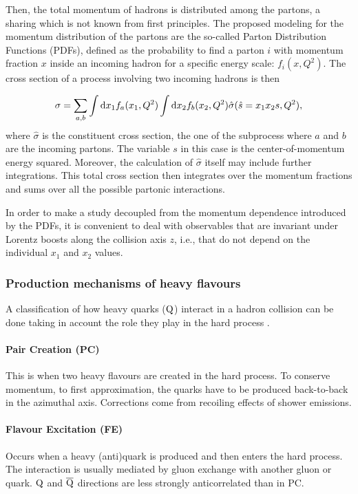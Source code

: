 \documentclass[a4paper,12pt]{article}
\begin{document}
Then, the total momentum of hadrons is distributed among the partons, a sharing which is not known from first principles. The proposed modeling for the momentum distribution of the partons are the so-called Parton Distribution Functions (PDFs), defined as the probability to find a parton $i$ with momentum fraction $x$ inside an incoming hadron for a specific energy scale: $f_i(x,Q^2)$. The cross section of a process involving two incoming hadrons is then

\begin{equation}
\sigma = \sum_{a,b} \int {\mathrm d} x_1 f_a(x_1,Q^2) \int {\mathrm d} x_2 f_b(x_2,Q^2) \hat{\sigma} (\hat{s}=x_1x_2s,Q^2), 
\end{equation}
where $\hat{\sigma}$ is the constituent cross section, the one of the subprocess where $a$ and $b$ are the incoming partons. The variable $s$ in this case is the center-of-momentum energy squared. Moreover, the calculation of $\hat{\sigma}$ itself may include further integrations. This total cross section then integrates over the momentum fractions and sums over all the possible partonic interactions.

In order to make a study decoupled from the momentum dependence introduced by the PDFs, it is convenient to deal with observables that are invariant under Lorentz boosts along the collision axis $z$, i.e., that do not depend on the individual $x_1$ and $x_2$ values.

\subsubsection{Production mechanisms of heavy flavours}

A classification of how heavy quarks (${\mathrm Q}$) interact in a hadron collision can be done taking in account the role they play in the hard process \cite{Norrbin:2000zc}.

\paragraph{Pair Creation (PC)} This is when two heavy flavours are created in the hard process. To conserve momentum, to first approximation, the quarks have to be produced back-to-back in the azimuthal axis. Corrections come from recoiling effects of shower emissions.

\paragraph{Flavour Excitation (FE)} Occurs when a heavy (anti)quark is produced and then enters the hard process. The interaction is usually mediated by gluon exchange with another gluon or quark. ${\mathrm Q}$ and $\overline{\mathrm Q}$ directions are less strongly anticorrelated than in PC.
\end{document}
